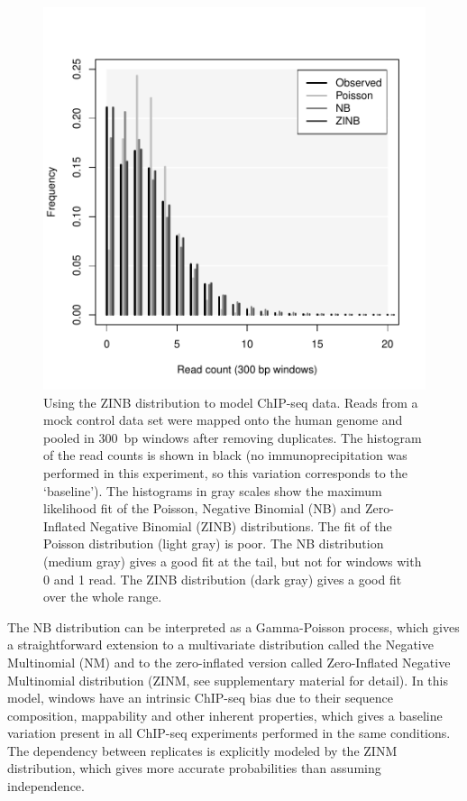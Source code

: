 \documentclass{bioinfo}
\begin{document}
\begin{methods}
\begin{figure}[!tpb]
\centerline{\includegraphics[scale=0.55]{ZINB_fit.pdf}}
\caption{
  Using the ZINB distribution to model ChIP-seq data. Reads from
  a mock control data set were mapped onto the human genome and
  pooled in 300~bp windows after removing duplicates. The histogram of
  the read counts is shown in black (no immunoprecipitation was
  performed in this experiment, so this variation corresponds to the
  `baseline'). The histograms in gray scales show the maximum
  likelihood fit of the Poisson, Negative Binomial (NB) and
  Zero-Inflated Negative Binomial (ZINB) distributions. The fit of
  the Poisson distribution (light gray) is poor. The NB distribution
  (medium gray) gives a good fit at the tail, but not for windows with
  0 and 1 read. The ZINB distribution (dark gray) gives a good fit
  over the whole range.
}\label{fig:ZINB_fit}
\end{figure}

The NB distribution can be interpreted as a Gamma-Poisson process,
which gives a straightforward extension to a multivariate
distribution called the Negative Multinomial (NM) and to the
zero-inflated version called Zero-Inflated Negative Multinomial
distribution (ZINM, see supplementary material for detail). In this
model, windows have an intrinsic ChIP-seq bias due to their sequence
composition, mappability and other inherent properties, which gives
a baseline variation present in all ChIP-seq experiments performed
in the same conditions. The dependency between replicates is
explicitly modeled by the ZINM distribution, which gives more
accurate probabilities than assuming independence.


\end{methods}
\end{document}
